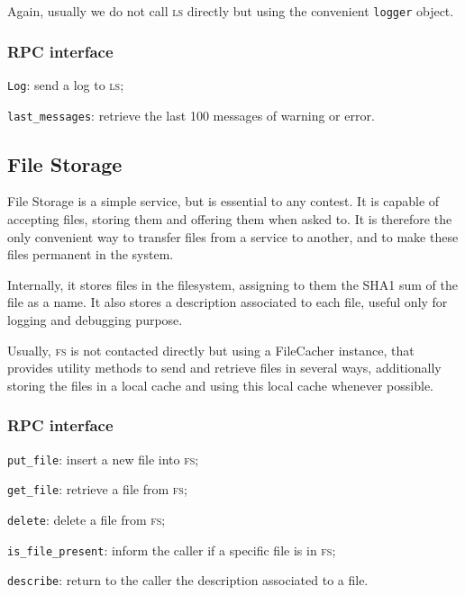 \documentclass[a4paper,8pt]{amsart}
\newcommand{\LS}{\textsc{ls}}
\newcommand{\FS}{\textsc{fs}}
\newenvironment{squishlist}{%
  \begin{list}{\textbullet}%
    { \setlength{\itemsep}{0pt}%
      \setlength{\parsep}{3pt}%
      \setlength{\topsep}{3pt}%
      \setlength{\partopsep}{0pt}%
      \setlength{\leftmargin}{1.5em}%
      \setlength{\labelwidth}{1em}%
      \setlength{\labelsep}{0.5em} }%
}{\end{list}}
\newcommand{\id}[1]{\texttt{#1}}
\begin{document}
\begin{multicols}{2}
  Again, usually we do not call \LS{} directly but using the
  convenient \id{logger} object.

  \subsubsection{RPC interface}

  \begin{squishlist}
  \item \id{Log}: send a log to \LS{};
  \item \id{last\_messages}: retrieve the last 100 messages of warning
    or error.
  \end{squishlist}

  \subsection{File Storage}

  File Storage is a simple service, but is essential to any
  contest. It is capable of accepting files, storing them and offering
  them when asked to. It is therefore the only convenient way to
  transfer files from a service to another, and to make these files
  permanent in the system.

  Internally, it stores files in the filesystem, assigning to them the
  SHA1 sum of the file as a name. It also stores a description
  associated to each file, useful only for logging and debugging
  purpose.

  Usually, \FS{} is not contacted directly but using a FileCacher
  instance, that provides utility methods to send and retrieve files
  in several ways, additionally storing the files in a local cache and
  using this local cache whenever possible.

  \subsubsection{RPC interface}

  \begin{squishlist}
  \item \id{put\_file}: insert a new file into \FS{};
  \item \id{get\_file}: retrieve a file from \FS{};
  \item \id{delete}: delete a file from \FS{};
  \item \id{is\_file\_present}: inform the caller if a specific file is
    in \FS{};
  \item \id{describe}: return to the caller the description associated
    to a file.
  \end{squishlist}


\end{multicols}
\end{document}
